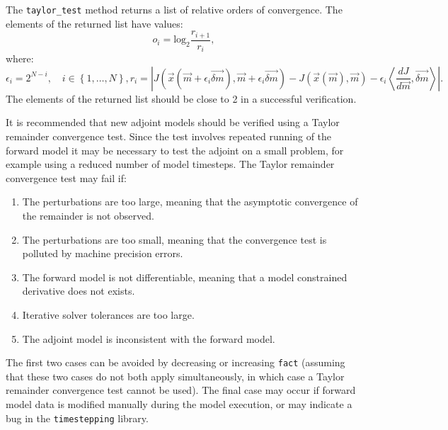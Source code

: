 \documentclass[a4paper]{book}
\begin{document}
The \verb+taylor_test+ method returns a list of relative orders of
convergence. The elements of the returned list have values:
\begin{equation}
  o_i = \textrm{log}_2 \frac{r_{i + 1}}{r_i},
\end{equation}
where:
\begin{subequations}
  \begin{equation}
    \epsilon_i = 2^{N - i}, \quad i \in \left\{1, \ldots, N \right\},
  \end{equation}
  \begin{equation}
    r_i = \left| J \left( \vec{x} \left( \vec{m} + \epsilon_i \vec{\delta m} \right), \vec{m} + \epsilon_i \vec{\delta m} \right)
      - J \left( \vec{x} \left( \vec{m} \right), \vec{m} \right)
      - \epsilon_i \left< \frac{d J}{d \vec{m}}, \vec{\delta m} \right> \right|.
  \end{equation}
\end{subequations}
The elements of the returned list should be close to 2 in a successful
verification.

It is recommended that new adjoint models should be verified using a Taylor
remainder convergence test. Since the test involves repeated running of the
forward model it may be necessary to test the adjoint on a small problem,
for example using a reduced number of model timesteps. The Taylor remainder
convergence test may fail if:
\begin{enumerate}
  \item The perturbations are too large, meaning that the asymptotic convergence
        of the remainder is not observed.
  \item The perturbations are too small, meaning that the convergence test is
        polluted by machine precision errors.
  \item The forward model is not differentiable, meaning that a model
        constrained derivative does not exists.
  \item Iterative solver tolerances are too large.
  \item The adjoint model is inconsistent with the forward model.
\end{enumerate}
The first two cases can be avoided by decreasing or increasing \verb+fact+
(assuming that these two cases do not both apply simultaneously, in which
case a Taylor remainder convergence test cannot be used). The final case may
occur if forward model data is modified manually during the model execution, or
may indicate a bug in the \verb+timestepping+ library.
\end{document}
